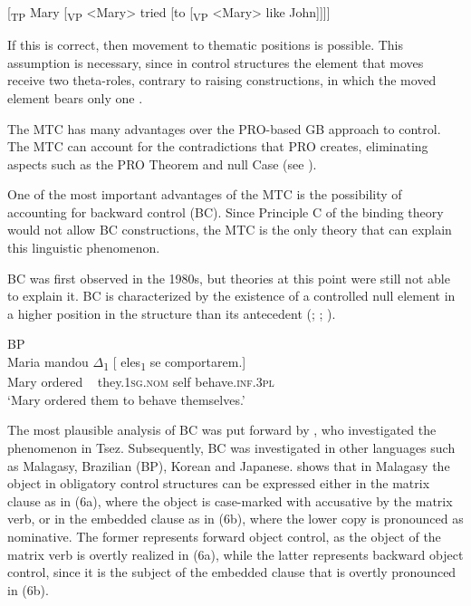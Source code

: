 \documentclass[output=paper]{langsci/langscibook}
\begin{document}
\ea%
\label{ex:moreno:4b}
[\textsubscript{TP} Mary [\textsubscript{VP} <Mary> tried [to [\textsubscript{VP} <Mary> like John]]]]
\z

If this is correct, then movement to thematic positions is possible. This assumption is necessary, since in control structures the element that moves receive two theta-roles, contrary to raising constructions, in which the moved element bears only one  \citep{Hornstein1999}.

The MTC has many advantages over the PRO-based GB approach to control. The MTC can account for the contradictions that PRO creates, eliminating aspects such as the PRO Theorem and null Case (see \citealt{Hornstein2001}). 

One of the most important advantages of the MTC is the possibility of accounting for backward control (BC). Since Principle C of the binding theory would not allow BC constructions, the MTC is the only theory that can explain this linguistic phenomenon. 

BC was first observed in the 1980s, but theories at this point were still not able to explain it. BC is characterized by the existence of a controlled null element in a higher position in the structure than its antecedent (\citealt{Farrell1995}; \citealt{Rodrigues2004}; \citealt{Boeckx2006}). 

\ea%
    BP\label{ex:moreno:3}\\
    \gll Maria mandou ${\Delta}$\textsubscript{1} [ eles\textsubscript{1} se comportarem.]  \\
         Mary ordered ~ {} they.\textsc{1sg.nom} self behave.\textsc{inf.3pl}\\
    \glt ‘Mary ordered them to behave themselves.’
    \z

The most plausible analysis of BC was put forward by \citet{Polinsky2002}, who investigated the phenomenon in Tsez. Subsequently, BC was investigated in other languages such as Malagasy, Brazilian  (BP), Korean and Japanese. \citet{Potsdam2009} shows that in Malagasy the object in obligatory control structures can be expressed either in the matrix clause as in (6a), where the object is case-marked with accusative by the matrix verb, or in the embedded clause as in (6b), where the lower copy is pronounced as nominative. The former represents forward object control, as the object of the matrix verb is overtly realized in (6a), while the latter represents backward object control, since it is the subject of the embedded clause that is overtly pronounced in (6b).
\end{document}

